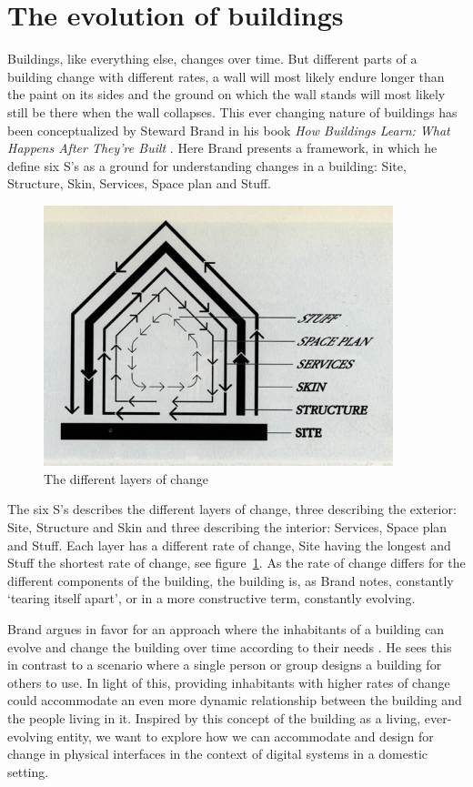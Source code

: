 \section{The evolution of buildings}
Buildings, like everything else, changes over time.
But different parts of a building change with different rates, a wall will most likely endure longer than the paint on its sides and the ground on which the wall stands will most likely still be there when the wall collapses.
This ever changing nature of buildings has been conceptualized by Steward Brand in his book \emph{How Buildings Learn: What Happens After They're Built} \citep{brand1995buildings}.
Here Brand presents a framework, in which he define six S's as a ground for understanding changes in a building: Site, Structure, Skin, Services, Space plan and Stuff.

\begin{figure}[hb]
	\centering
  		\includegraphics[width=4in]{figures/brand-diagram}
	\caption[The different layers of change, taken from \cite{brand1995buildings}]
   {The different layers of change \cite{brand1995buildings}}
   \label{brand-diagram}
\end{figure}

The six S's describes the different layers of change, three describing the exterior: Site, Structure and Skin and three describing the interior: Services, Space plan and Stuff.
Each layer has a different rate of change, Site having the longest and Stuff the shortest rate of change, see figure~\ref{brand-diagram}. As the rate of change differs for the different components of the building, the building is, as Brand notes, constantly `tearing itself apart', or in a more constructive term, constantly evolving.

Brand argues in favor for an approach where the inhabitants of a building can evolve and change the building over time according to their needs \citep{brandBBCvideo}.
He sees this in contrast to a scenario where a single person or group designs a building for others to use.
In light of this, providing inhabitants with higher rates of change could accommodate an even more dynamic relationship between the building and the people living in it.
Inspired by this concept of the building as a living, ever-evolving entity, we want to explore how we can accommodate and design for change in physical interfaces in the context of digital systems in a domestic setting.

